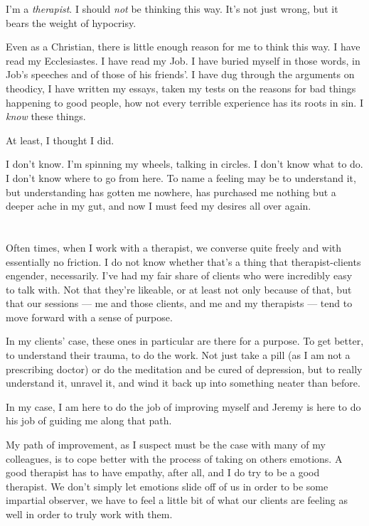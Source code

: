 I'm a \emph{therapist}. I should \emph{not} be thinking this way. It's not just wrong, but it bears the weight of hypocrisy.

Even as a Christian, there is little enough reason for me to think this way. I have read my Ecclesiastes. I have read my Job. I have buried myself in those words, in Job's speeches and of those of his friends'. I have dug through the arguments on theodicy, I have written my essays, taken my tests on the reasons for bad things happening to good people, how not every terrible experience has its roots in sin. I \emph{know} these things.

At least, I thought I did.

I don't know. I'm spinning my wheels, talking in circles. I don't know what to do. I don't know where to go from here. To name a feeling may be to understand it, but understanding has gotten me nowhere, has purchased me nothing but a deeper ache in my gut, and now I must feed my desires all over again.

\section{}

Often times, when I work with a therapist, we converse quite freely and with essentially no friction. I do not know whether that's a thing that therapist-clients engender, necessarily. I've had my fair share of clients who were incredibly easy to talk with. Not that they're likeable, or at least not only because of that, but that our sessions --- me and those clients, and me and my therapists --- tend to move forward with a sense of purpose.

In my clients' case, these ones in particular are there for a purpose. To get better, to understand their trauma, to do the work. Not just take a pill (as I am not a prescribing doctor) or do the meditation and be cured of depression, but to really understand it, unravel it, and wind it back up into something neater than before.

In my case, I am here to do the job of improving myself and Jeremy is here to do his job of guiding me along that path.

My path of improvement, as I suspect must be the case with many of my colleagues, is to cope better with the process of taking on others emotions. A good therapist has to have empathy, after all, and I do try to be a good therapist. We don't simply let emotions slide off of us in order to be some impartial observer, we have to feel a little bit of what our clients are feeling as well in order to truly work with them.

